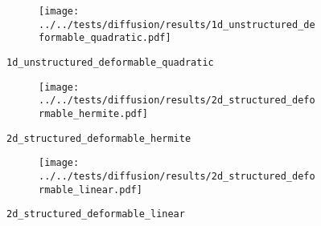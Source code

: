 %
%
\begin{frame}{}
  \vspace*{-0.2cm}
  \begin{figure}[h!]
    \begin{subfigure}[t]{0.5\textwidth}%
    \centering
    \end{subfigure}
    \begin{subfigure}[t]{0.48\textwidth}%
      \centering%
      \texttt{[image: ../../tests/diffusion/results/1d\_unstructured\_deformable\_quadratic.pdf]}%
    \end{subfigure}%
    \caption{\lstinline{1d_unstructured_deformable_quadratic}}
  \end{figure} 
\end{frame}
%
%
\begin{frame}{}
  \vspace*{-0.2cm}
  \begin{figure}[h!]
    \begin{subfigure}[t]{0.5\textwidth}%
    \centering
    \end{subfigure}
    \begin{subfigure}[t]{0.48\textwidth}%
      \centering%
      \texttt{[image: ../../tests/diffusion/results/2d\_structured\_deformable\_hermite.pdf]}%
    \end{subfigure}%
    \caption{\lstinline{2d_structured_deformable_hermite}}
  \end{figure} 
\end{frame}
%
%
\begin{frame}{}
  \vspace*{-0.2cm}
  \begin{figure}[h!]
    \begin{subfigure}[t]{0.5\textwidth}%
    \centering
    \end{subfigure}
    \begin{subfigure}[t]{0.48\textwidth}%
      \centering%
      \texttt{[image: ../../tests/diffusion/results/2d\_structured\_deformable\_linear.pdf]}%
    \end{subfigure}%
    \caption{\lstinline{2d_structured_deformable_linear}}
  \end{figure} 
\end{frame}
